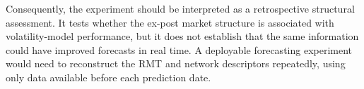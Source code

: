 Consequently, the experiment should be interpreted as a retrospective structural assessment. It tests whether the ex-post market structure is associated with volatility-model performance, but it does not establish that the same information could have improved forecasts in real time. A deployable forecasting experiment would need to reconstruct the RMT and network descriptors repeatedly, using only data available before each prediction date.
